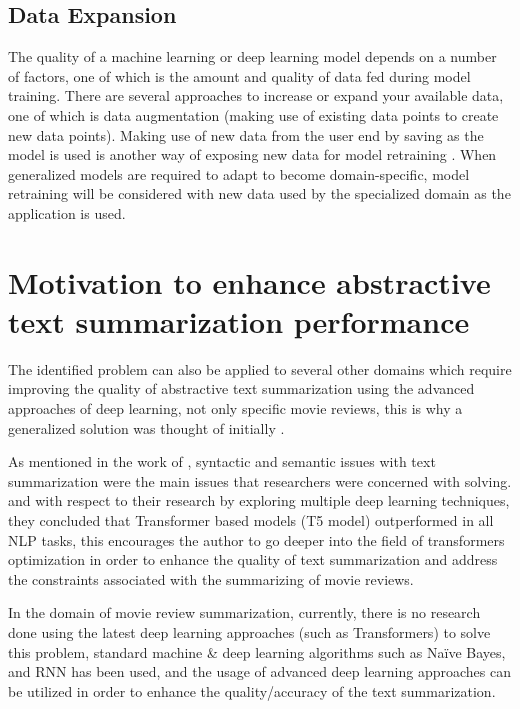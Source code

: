 \documentclass[conference]{IEEEtran}
\begin{document}
\subsection{Data Expansion}
The quality of a machine learning or deep learning model depends on a number of factors, one of which is the amount and quality of data fed during model training. There are several approaches to increase or expand your available data, one of which is data augmentation (making use of existing data points to create new data points). Making use of new data from the user end by saving as the model is used is another way of exposing new data for model retraining \cite{barna_heickal_2022}. When generalized models are required to adapt to become domain-specific, model retraining will be considered with new data used by the specialized domain as the application is used.

\section{Motivation to enhance abstractive text summarization performance}

The identified problem can also be applied to several other domains which require improving the quality of abstractive text summarization using the advanced approaches of deep learning, not only specific movie reviews, this is why a generalized solution was thought of initially \cite{kouris_alexandridis_stafylopatis_2019}. 

As mentioned in the work of \cite{etemad_abidi_chhabra_2021}, syntactic and semantic issues with text summarization were the main issues that researchers were concerned with solving. and with respect to their research by exploring multiple deep learning techniques, they concluded that Transformer based models (T5 model) outperformed in all NLP tasks, this encourages the author to go deeper into the field of transformers optimization in order to enhance the quality of text summarization and address the constraints associated with the summarizing of movie reviews.

In the domain of movie review summarization, currently, there is no research done using the latest deep learning approaches (such as Transformers) to solve this problem, standard machine \& deep learning algorithms such as Naïve Bayes, and RNN has been used, and the usage of advanced deep learning approaches can be utilized in order to enhance the quality/accuracy of the text summarization.
\end{document}
